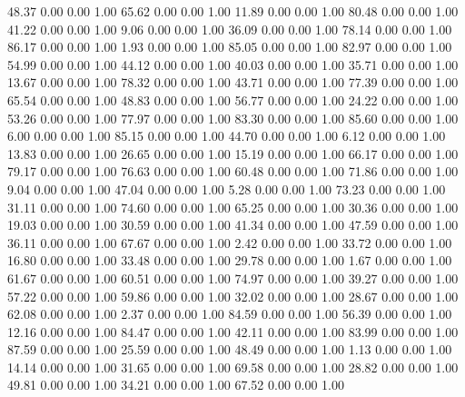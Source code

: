    48.37   0.00   0.00   1.00
   65.62   0.00   0.00   1.00
   11.89   0.00   0.00   1.00
   80.48   0.00   0.00   1.00
   41.22   0.00   0.00   1.00
    9.06   0.00   0.00   1.00
   36.09   0.00   0.00   1.00
   78.14   0.00   0.00   1.00
   86.17   0.00   0.00   1.00
    1.93   0.00   0.00   1.00
   85.05   0.00   0.00   1.00
   82.97   0.00   0.00   1.00
   54.99   0.00   0.00   1.00
   44.12   0.00   0.00   1.00
   40.03   0.00   0.00   1.00
   35.71   0.00   0.00   1.00
   13.67   0.00   0.00   1.00
   78.32   0.00   0.00   1.00
   43.71   0.00   0.00   1.00
   77.39   0.00   0.00   1.00
   65.54   0.00   0.00   1.00
   48.83   0.00   0.00   1.00
   56.77   0.00   0.00   1.00
   24.22   0.00   0.00   1.00
   53.26   0.00   0.00   1.00
   77.97   0.00   0.00   1.00
   83.30   0.00   0.00   1.00
   85.60   0.00   0.00   1.00
    6.00   0.00   0.00   1.00
   85.15   0.00   0.00   1.00
   44.70   0.00   0.00   1.00
    6.12   0.00   0.00   1.00
   13.83   0.00   0.00   1.00
   26.65   0.00   0.00   1.00
   15.19   0.00   0.00   1.00
   66.17   0.00   0.00   1.00
   79.17   0.00   0.00   1.00
   76.63   0.00   0.00   1.00
   60.48   0.00   0.00   1.00
   71.86   0.00   0.00   1.00
    9.04   0.00   0.00   1.00
   47.04   0.00   0.00   1.00
    5.28   0.00   0.00   1.00
   73.23   0.00   0.00   1.00
   31.11   0.00   0.00   1.00
   74.60   0.00   0.00   1.00
   65.25   0.00   0.00   1.00
   30.36   0.00   0.00   1.00
   19.03   0.00   0.00   1.00
   30.59   0.00   0.00   1.00
   41.34   0.00   0.00   1.00
   47.59   0.00   0.00   1.00
   36.11   0.00   0.00   1.00
   67.67   0.00   0.00   1.00
    2.42   0.00   0.00   1.00
   33.72   0.00   0.00   1.00
   16.80   0.00   0.00   1.00
   33.48   0.00   0.00   1.00
   29.78   0.00   0.00   1.00
    1.67   0.00   0.00   1.00
   61.67   0.00   0.00   1.00
   60.51   0.00   0.00   1.00
   74.97   0.00   0.00   1.00
   39.27   0.00   0.00   1.00
   57.22   0.00   0.00   1.00
   59.86   0.00   0.00   1.00
   32.02   0.00   0.00   1.00
   28.67   0.00   0.00   1.00
   62.08   0.00   0.00   1.00
    2.37   0.00   0.00   1.00
   84.59   0.00   0.00   1.00
   56.39   0.00   0.00   1.00
   12.16   0.00   0.00   1.00
   84.47   0.00   0.00   1.00
   42.11   0.00   0.00   1.00
   83.99   0.00   0.00   1.00
   87.59   0.00   0.00   1.00
   25.59   0.00   0.00   1.00
   48.49   0.00   0.00   1.00
    1.13   0.00   0.00   1.00
   14.14   0.00   0.00   1.00
   31.65   0.00   0.00   1.00
   69.58   0.00   0.00   1.00
   28.82   0.00   0.00   1.00
   49.81   0.00   0.00   1.00
   34.21   0.00   0.00   1.00
   67.52   0.00   0.00   1.00
